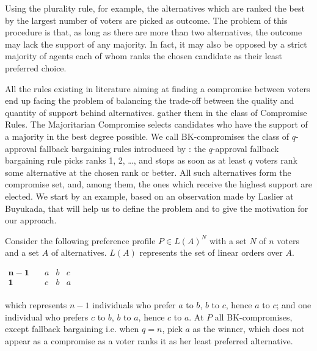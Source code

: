 \documentclass[version=3.21, pagesize, notitlepage, twoside=off, bibliography=totoc, DIV=calc, fontsize=12pt, a4paper]{scrartcl}
\begin{document}
Using the plurality rule, for example, the alternatives which are ranked the best by the largest number of voters are picked as outcome. The problem of this procedure is that, as long as there are more than two alternatives, the outcome may lack the support of any majority. In fact, it may also be opposed by a strict majority of agents each of whom ranks the chosen candidate as their least preferred choice. 

All the rules existing in literature aiming at finding a compromise between voters end up facing the problem of balancing the trade-off between the quality and quantity of support behind alternatives. \citet{Merlin2019} gather them in the class of Compromise Rules. The Majoritarian Compromise \citep{Sertel1999} selects candidates who have the support of a majority in the best degree possible. 
We call BK-compromises the class of $q$-approval fallback bargaining rules introduced by \citet{Brams2001}: the $q$-approval fallback bargaining rule picks ranks 1, 2, …, and stops as soon as at least $q$ voters rank some alternative at the chosen rank or better. All such alternatives form the compromise set, and, among them, the ones which receive the highest support are elected.
We start by an example, based on an observation made by Laslier at Buyukada, that will help us to define the problem and to give the motivation for our approach.


\begin{example}
	\label{ex:ex1}
	Consider the following preference profile $P\in L(A)^{N}$ with a set $N$ of $n$ voters and a set $A$ of alternatives. $L(A)$ represents the set of linear orders over $A$.
	\begin{center}
		$
		\begin{array}{cccc}
		\mathbf{n-1} \quad &a&b&c\\
		\mathbf{1} \quad &c&b&a\\
		\end{array}
		$
	\end{center}
	which represents $n-1$ individuals who prefer $a$ to $b$, $b$ to $c$, hence $a$ to $c$; and one individual who prefers $c$ to $b$, $b$ to $a$, hence $c$ to $a $. At $P$ all BK-compromises, except fallback bargaining i.e. when $q=n$, pick $a$ as the winner, which does not appear as a compromise as a voter ranks it as her least preferred alternative.
\end{example}
\end{document}
